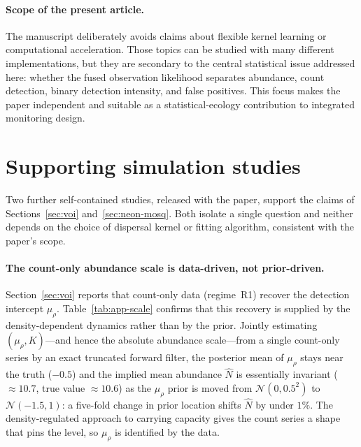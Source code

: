 \documentclass[preprint,12pt]{elsarticle}
\theoremstyle{definition}
\begin{document}
\paragraph{Scope of the present article.}
The manuscript deliberately avoids claims about flexible kernel learning or
computational acceleration. Those topics can be studied with many different
implementations, but they are secondary to the central statistical issue
addressed here: whether the fused observation likelihood separates abundance,
count detection, binary detection intensity, and false positives. This focus
makes the paper independent and suitable as a statistical-ecology contribution
to integrated monitoring design.

\appendix
\section{Supporting simulation studies}
\label{app:supporting}

Two further self-contained studies, released with the paper, support the claims
of Sections~\ref{sec:voi} and~\ref{sec:neon-mosq}. Both isolate a single
question and neither depends on the choice of dispersal kernel or fitting
algorithm, consistent with the paper's scope.

\paragraph{The count-only abundance scale is data-driven, not prior-driven.}
Section~\ref{sec:voi} reports that count-only data (regime~R1) recover the
detection intercept $\mu_\rho$. Table~\ref{tab:app-scale} confirms that this
recovery is supplied by the density-dependent dynamics rather than by the prior.
Jointly estimating $(\mu_\rho,K)$---and hence the absolute abundance scale---from
a single count-only series by an exact truncated forward filter, the posterior
mean of $\mu_\rho$ stays near the truth ($-0.5$) and the implied mean abundance
$\hat N$ is essentially invariant ($\approx\!10.7$, true value $\approx\!10.6$)
as the $\mu_\rho$ prior is moved from $\mathcal N(0,0.5^2)$ to $\mathcal
N(-1.5,1)$: a five-fold change in prior location shifts $\hat N$ by under
$1\%$. The density-regulated approach to carrying capacity gives the count
series a shape that pins the level, so $\mu_\rho$ is identified by the data.
\end{document}
